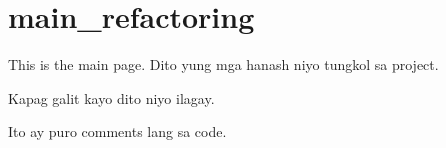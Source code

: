 \chapter{main\+\_\+refactoring}
\hypertarget{index}{}\label{index}
This is the main page. Dito yung mga hanash niyo tungkol sa project.

Kapag galit kayo dito niyo ilagay.

Ito ay puro comments lang sa code. 